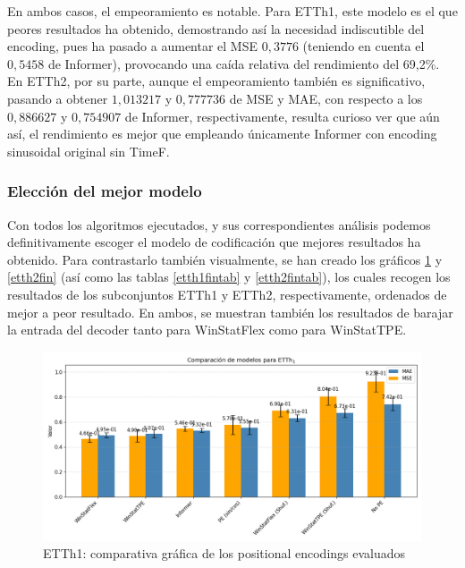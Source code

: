 En ambos casos, el empeoramiento es notable. Para ETTh1, este modelo es el que peores resultados ha obtenido, demostrando así la necesidad indiscutible del encoding, pues ha pasado a aumentar el MSE $0,3776$ (teniendo en cuenta el $0,5458$ de Informer), provocando una caída relativa del rendimiento del 69,2\%.\\

En ETTh2, por su parte, aunque el empeoramiento también es significativo, pasando a obtener $1,013217$ y $0,777736$ de MSE  y MAE, con respecto a los $0,886627$ y $0,754907$ de Informer, respectivamente, resulta curioso ver que aún así, el rendimiento es mejor que empleando únicamente Informer con encoding sinusoidal original sin TimeF. 

\subsubsection{Elección del mejor modelo}

Con todos los algoritmos ejecutados, y sus correspondientes análisis podemos definitivamente escoger el modelo de codificación que mejores resultados ha obtenido. Para contrastarlo también visualmente, se han creado los gráficos \ref{etth1fin} y \ref{etth2fin} (así como las tablas \ref{etth1fintab} y \ref{etth2fintab}), los cuales recogen los resultados de los subconjuntos ETTh1 y ETTh2, respectivamente, ordenados de mejor a peor resultado. En ambos, se muestran también los resultados de barajar la entrada del decoder tanto para WinStatFlex como para WinStatTPE.\\


\begin{figure}[!ht]
	\centering
	\includegraphics[scale=0.475]{img/etth1fin}
	\caption{ETTh1: comparativa gráfica de los positional encodings evaluados}
	\label{etth1fin}
\end{figure}

